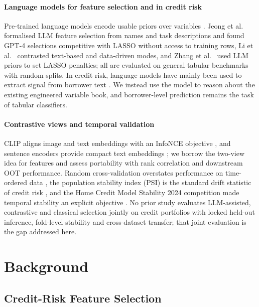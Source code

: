 \documentclass[final,5p,twocolumn]{elsarticle}
\begin{document}
\paragraph{Language models for feature selection and in credit risk}
Pre-trained language models encode usable priors over variables \cite{choi2022}. Jeong et al.\ \cite{jeong2025} formalised LLM feature selection from names and task descriptions and found GPT-4 selections competitive with LASSO without access to training rows, Li et al.\ \cite{li2025sigkdd} contrasted text-based and data-driven modes, and Zhang et al.\ \cite{zhang2025llmlasso} used LLM priors to set LASSO penalties; all are evaluated on general tabular benchmarks with random splits. In credit risk, language models have mainly been used to extract signal from borrower text \cite{sanzguerrero2025,xia2025}. We instead use the model to reason about the existing engineered variable book, and borrower-level prediction remains the task of tabular classifiers.

\paragraph{Contrastive views and temporal validation}
CLIP aligns image and text embeddings with an InfoNCE objective \cite{radford2021,oord2018}, and sentence encoders provide compact text embeddings \cite{reimers2019,wang2020minilm}; we borrow the two-view idea for features and assess portability with rank correlation \cite{spearman1904} and downstream OOT performance. Random cross-validation overstates performance on time-ordered data \cite{bergmeir2012,gama2014}, the population stability index (PSI) is the standard drift statistic of credit risk \cite{yurdakul2020}, and the Home Credit Model Stability 2024 competition made temporal stability an explicit objective \cite{homecredit2024}. No prior study evaluates LLM-assisted, contrastive and classical selection jointly on credit portfolios with locked held-out inference, fold-level stability and cross-dataset transfer; that joint evaluation is the gap addressed here.


\section{Background}
\label{sec:background}

\subsection{Credit-Risk Feature Selection}
\label{subsec:credit_risk_fs}
\end{document}
